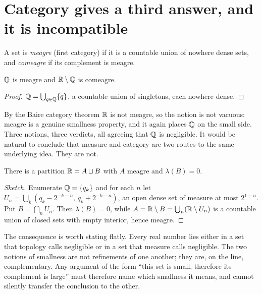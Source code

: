 \documentclass{essay}
\newcommand{\Irr}{\R \setminus \Q}
\begin{document}
\section{Category gives a third answer, and it is incompatible}

\begin{definition}
A set is \emph{meagre} (first category) if it is a countable union of
nowhere dense sets, and \emph{comeagre} if its complement is meagre.
\end{definition}

\begin{proposition}
$\mathbb{Q}$ is meagre and $\Irr$ is comeagre.
\end{proposition}

\begin{proof}
$\mathbb{Q} = \bigcup_{q \in \mathbb{Q}} \{q\}$, a countable union of singletons, each
nowhere dense.
\end{proof}

By the Baire category theorem $\mathbb{R}$ is not meagre, so the notion is not
vacuous: meagre is a genuine smallness property, and it again places
$\mathbb{Q}$ on the small side. Three notions, three verdicts, all agreeing
that $\mathbb{Q}$ is negligible. It would be natural to conclude that measure
and category are two routes to the same underlying idea. They are not.

\begin{theorem}
There is a partition $\mathbb{R} = A \sqcup B$ with $A$ meagre and $\lambda(B)
= 0$.
\end{theorem}

\begin{proof}[Sketch]
Enumerate $\mathbb{Q} = \{q_k\}$ and for each $n$ let $U_n = \bigcup_k (q_k -
2^{-k-n},\, q_k + 2^{-k-n})$, an open dense set of measure at most
$2^{1-n}$. Put $B = \bigcap_n U_n$. Then $\lambda(B) = 0$, while
$A = \mathbb{R} \setminus B = \bigcup_n (\mathbb{R} \setminus U_n)$ is a countable
union of closed sets with empty interior, hence meagre.
\end{proof}

The consequence is worth stating flatly. Every real number lies either
in a set that topology calls negligible or in a set that measure calls
negligible. The two notions of smallness are not refinements of one
another; they are, on the line, complementary. Any argument of the form
``this set is small, therefore its complement is large'' must therefore
name which smallness it means, and cannot silently transfer the
conclusion to the other.
\end{document}

